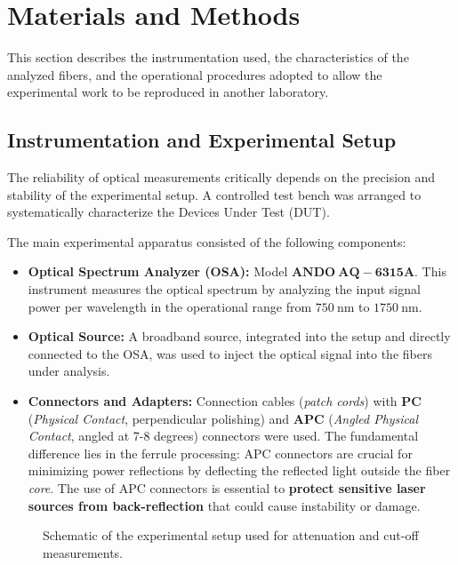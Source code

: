 \documentclass[a4paper,11pt]{article}
\theoremstyle{mythmstyle}
\begin{document}
\section{Materials and Methods}

This section describes the instrumentation used, the characteristics of the analyzed fibers, and the operational procedures adopted to allow the experimental work to be reproduced in another laboratory.

\subsection{Instrumentation and Experimental Setup}
The reliability of optical measurements critically depends on the precision and stability of the experimental setup. A controlled test bench was arranged to systematically characterize the Devices Under Test (DUT).

The main experimental apparatus consisted of the following components:
\begin{itemize}
    \item \textbf{Optical Spectrum Analyzer (OSA):} Model $\mathbf{ANDO\ AQ-6315A}$. This instrument measures the optical spectrum by analyzing the input signal power per wavelength in the operational range from $750\ \text{nm}$ to $1750\ \text{nm}$.
    \item \textbf{Optical Source:} A broadband source, integrated into the setup and directly connected to the OSA, was used to inject the optical signal into the fibers under analysis.
    \item \textbf{Connectors and Adapters:} Connection cables (\textit{patch cords}) with \textbf{PC} (\textit{Physical Contact}, perpendicular polishing) and \textbf{APC} (\textit{Angled Physical Contact}, angled at 7-8 degrees) connectors were used. The fundamental difference lies in the ferrule processing: APC connectors are crucial for minimizing power reflections by deflecting the reflected light outside the fiber \textit{core}. The use of APC connectors is essential to \textbf{protect sensitive laser sources from back-reflection} that could cause instability or damage.
\end{itemize}

\begin{figure}[H]
    \centering
    \framebox[0.8\linewidth]{\rule{0pt}{4cm} }
    \caption{Schematic of the experimental setup used for attenuation and cut-off measurements.}
    \label{fig:setup}
\end{figure}
\end{document}
